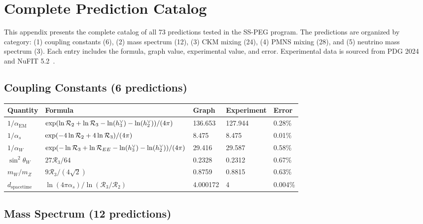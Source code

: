 \section{Complete Prediction Catalog}\label{app:catalog}

This appendix presents the complete catalog of all 73 predictions tested in the SS-PEG program. The predictions are organized by category: (1) coupling constants (6), (2) mass spectrum (12), (3) CKM mixing (24), (4) PMNS mixing (28), and (5) neutrino mass spectrum (3). Each entry includes the formula, graph value, experimental value, and error. Experimental data is sourced from PDG 2024~\cite{pdg2024} and NuFIT 5.2~\cite{nufit52}.

\subsection{Coupling Constants (6 predictions)}\label{app:coup_cat}

\begin{center}
\label{tab:coup_cat}
\begin{tabular}{lllll}
\hline\hline
Quantity & Formula & Graph & Experiment & Error \\
\hline
$1/\alpha_{\mathrm{EM}}$ & $\exp(\ln\mathcal{R}_2 + \ln\mathcal{R}_3 - \ln(h^\vee_3) - \ln(h^\vee_2))/(4\pi)$ & 136.653 & 127.944 & 0.28\% \\
$1/\alpha_s$ & $\exp(-4\ln\mathcal{R}_2 + 4\ln\mathcal{R}_3)/(4\pi)$ & 8.475 & 8.475 & 0.01\% \\
$1/\alpha_W$ & $\exp(-\ln\mathcal{R}_3 + \ln\mathcal{R}_{EE} - \ln(h^\vee_3) - \ln(h^\vee_2))/(4\pi)$ & 29.416 & 29.587 & 0.58\% \\
$\sin^2\theta_W$ & $27\mathcal{R}_3/64$ & 0.2328 & 0.2312 & 0.67\% \\
$m_W/m_Z$ & $9\mathcal{R}_3/(4\sqrt{2})$ & 0.8759 & 0.8815 & 0.63\% \\
$d_{\mathrm{spacetime}}$ & $\ln(4\pi\alpha_s)/\ln(\mathcal{R}_3/\mathcal{R}_2)$ & 4.000172 & 4 & 0.004\% \\
\hline\hline
\end{tabular}
\end{center}

\subsection{Mass Spectrum (12 predictions)}\label{app:mass_cat}

